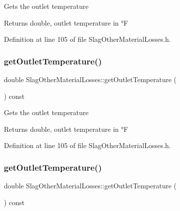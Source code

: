 Gets the outlet temperature

\begin{DoxyReturn}{Returns}
double, outlet temperature in °F 
\end{DoxyReturn}


Definition at line 105 of file Slag\+Other\+Material\+Losses.\+h.

\mbox{\label{class_slag_other_material_losses_a1c48f1a70aaf030451b7e350f3d6cd18}} 
\subsubsection{\texorpdfstring{get\+Outlet\+Temperature()}{getOutletTemperature()}\hspace{0.1cm}{\footnotesize\ttfamily [2/3]}}
{\footnotesize\ttfamily double Slag\+Other\+Material\+Losses\+::get\+Outlet\+Temperature (\begin{DoxyParamCaption}{ }\end{DoxyParamCaption}) const\hspace{0.3cm}{\ttfamily [inline]}}

Gets the outlet temperature

\begin{DoxyReturn}{Returns}
double, outlet temperature in °F 
\end{DoxyReturn}


Definition at line 105 of file Slag\+Other\+Material\+Losses.\+h.

\mbox{\label{class_slag_other_material_losses_a1c48f1a70aaf030451b7e350f3d6cd18}} 
\subsubsection{\texorpdfstring{get\+Outlet\+Temperature()}{getOutletTemperature()}\hspace{0.1cm}{\footnotesize\ttfamily [3/3]}}
{\footnotesize\ttfamily double Slag\+Other\+Material\+Losses\+::get\+Outlet\+Temperature (\begin{DoxyParamCaption}{ }\end{DoxyParamCaption}) const\hspace{0.3cm}{\ttfamily [inline]}}

